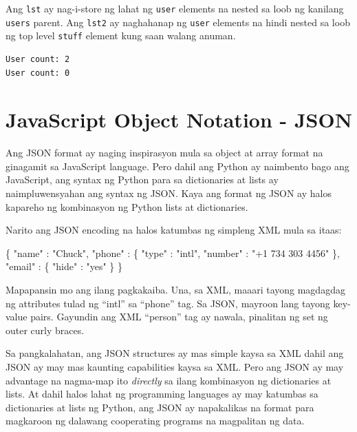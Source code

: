 \documentclass[10pt,]{book}
\newenvironment{Shaded}{}{}
\newcommand{\DataTypeTok}[1]{\textcolor[rgb]{0.56,0.13,0.00}{#1}}
\newcommand{\FunctionTok}[1]{\textcolor[rgb]{0.02,0.16,0.49}{#1}}
\newcommand{\StringTok}[1]{\textcolor[rgb]{0.25,0.44,0.63}{#1}}
\begin{document}
Ang \texttt{lst} ay nag-i-store ng lahat ng \texttt{user} elements na
nested sa loob ng kanilang \texttt{users} parent. Ang \texttt{lst2} ay
naghahanap ng \texttt{user} elements na hindi nested sa loob ng top
level \texttt{stuff} element kung saan walang anuman.

{\small
\begin{verbatim}
User count: 2
User count: 0
\end{verbatim}
}

\section{JavaScript Object Notation -
JSON}\label{javascript-object-notation---json}

 

Ang JSON format ay naging inspirasyon mula sa object at array format na
ginagamit sa JavaScript language. Pero dahil ang Python ay naimbento
bago ang JavaScript, ang syntax ng Python para sa dictionaries at lists
ay naimpluwensyahan ang syntax ng JSON. Kaya ang format ng JSON ay halos
kapareho ng kombinasyon ng Python lists at dictionaries.

Narito ang JSON encoding na halos katumbas ng simpleng XML mula sa
itaas:

\begin{Shaded}
\begin{Highlighting}[]
\FunctionTok{\{}
  \DataTypeTok{"name"} \FunctionTok{:} \StringTok{"Chuck"}\FunctionTok{,}
  \DataTypeTok{"phone"} \FunctionTok{:} \FunctionTok{\{}
    \DataTypeTok{"type"} \FunctionTok{:} \StringTok{"intl"}\FunctionTok{,}
    \DataTypeTok{"number"} \FunctionTok{:} \StringTok{"+1 734 303 4456"}
   \FunctionTok{\},}
   \DataTypeTok{"email"} \FunctionTok{:} \FunctionTok{\{}
     \DataTypeTok{"hide"} \FunctionTok{:} \StringTok{"yes"}
   \FunctionTok{\}}
\FunctionTok{\}}
\end{Highlighting}
\end{Shaded}

Mapapansin mo ang ilang pagkakaiba. Una, sa XML, maaari tayong magdagdag
ng attributes tulad ng ``intl'' sa ``phone'' tag. Sa JSON, mayroon lang
tayong key-value pairs. Gayundin ang XML ``person'' tag ay nawala,
pinalitan ng set ng outer curly braces.

Sa pangkalahatan, ang JSON structures ay mas simple kaysa sa XML dahil
ang JSON ay may mas kaunting capabilities kaysa sa XML. Pero ang JSON ay
may advantage na nagma-map ito \emph{directly} sa ilang kombinasyon ng
dictionaries at lists. At dahil halos lahat ng programming languages ay
may katumbas sa dictionaries at lists ng Python, ang JSON ay napakalikas
na format para magkaroon ng dalawang cooperating programs na magpalitan
ng data.
\end{document}
